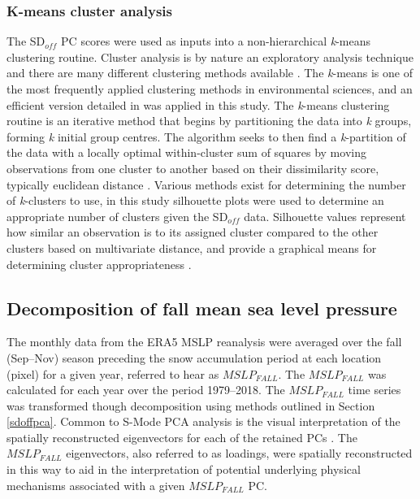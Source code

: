 \documentclass{tATO2e}
\newcommand{\sdoff}{SD$_{off}$}
\begin{document}
\subsubsection{K-means cluster analysis}
The \sdoff{} PC scores were used as inputs into a non-hierarchical \textit{k}-means clustering routine. Cluster analysis is by nature an exploratory analysis technique and there are many different clustering methods available \citep{Gotelli2013}. The \textit{k}-means is one of the most frequently applied clustering methods in environmental sciences, and an efficient version detailed in \cite{Hartigan1979} was applied in this study. The \textit{k}-means clustering routine is an iterative method that begins by partitioning the data into \textit{k} groups, forming \textit{k} initial group centres. The algorithm seeks to then find a \textit{k}-partition of the data with a locally optimal within-cluster sum of squares by moving observations from one cluster to another based on their dissimilarity score, typically euclidean distance \citep{Hartigan1979}. Various methods exist for determining the number of \textit{k}-clusters to use, in this study silhouette plots were used to determine an appropriate number of clusters given the \sdoff{} data. Silhouette values represent how similar an observation is to its assigned cluster compared to the other clusters based on multivariate distance, and provide a graphical means for determining cluster appropriateness \citep{Rousseeuw1987}.

\subsection{Decomposition of fall mean sea level pressure}
The monthly data from the ERA5 MSLP reanalysis were averaged over the fall (Sep--Nov) season preceding the snow accumulation period at each location (pixel) for a given year, referred to hear as $MSLP_{FALL}$. The $MSLP_{FALL}$ was calculated for each year over the period 1979--2018. The $MSLP_{FALL}$ time series was transformed though decomposition using methods outlined in Section \ref{sdoffpca}. Common to S-Mode PCA analysis is the visual interpretation of the spatially reconstructed  eigenvectors for each of the retained PCs \citep{Urska2013}. The $MSLP_{FALL}$ eigenvectors, also referred to as loadings, were spatially reconstructed in this way to aid in the interpretation of potential underlying physical mechanisms associated with a given $MSLP_{FALL}$ PC. 
\end{document}
